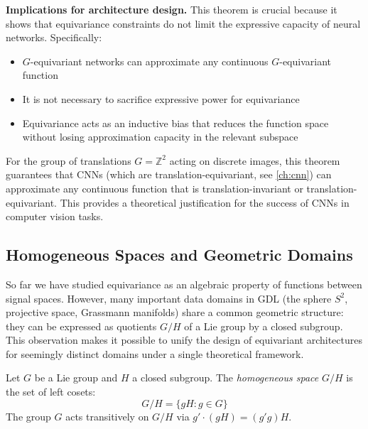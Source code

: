 \textbf{Implications for architecture design.} This theorem is crucial because it shows that equivariance constraints do not limit the expressive capacity of neural networks. Specifically:

\begin{itemize}
    \item $G$-equivariant networks can approximate any continuous $G$-equivariant function
    \item It is not necessary to sacrifice expressive power for equivariance
    \item Equivariance acts as an inductive bias that reduces the function space without losing approximation capacity in the relevant subspace
\end{itemize}

\begin{example}
For the group of translations $G = \mathbb{Z}^2$ acting on discrete images, this theorem guarantees that \glspl{CNN} (which are translation-equivariant, see \autoref{ch:cnn}) can approximate any continuous function that is translation-invariant or translation-equivariant. This provides a theoretical justification for the success of \glspl{CNN} in computer vision tasks.
\end{example}

\subsection{Homogeneous Spaces and Geometric Domains}\label{subsec:espacios_homogeneos}

So far we have studied equivariance as an algebraic property of functions between signal spaces. However, many important data domains in \gls{GDL} (the sphere $S^2$, projective space, Grassmann manifolds) share a common geometric structure: they can be expressed as quotients $G/H$ of a Lie group by a closed subgroup. This observation makes it possible to unify the design of equivariant architectures for seemingly distinct domains under a single theoretical framework.

\begin{definition}\label{def:espacio_homogeneo}
Let $G$ be a Lie group and $H$ a closed subgroup. The \textit{homogeneous space} $G/H$ is the set of left cosets:
\begin{equation}
G/H = \{gH : g \in G\}
\end{equation}
The group $G$ acts transitively on $G/H$ via $g' \cdot (gH) = (g'g)H$.
\end{definition}


